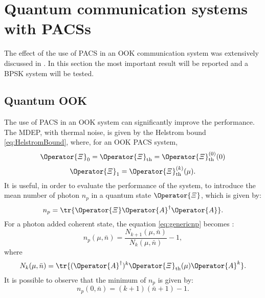 \section{Quantum communication systems with PACSs}
    The effect of the use of PACS in an OOK communication system was extensively discussed in
    \cite{PACSDisc}. In this section the most important result will be reported and a BPSK
    system will be tested.

    \subsection{Quantum OOK}
    The use of PACS in an OOK system can significantly improve the performance. The MDEP, with
    thermal noise, is given by the Helstrom bound \ref{eq:HelstromBound}, where, for an OOK PACS
    system,
    \begin{equation}
        \Operator{\varXi}_0 =  \Operator{\varXi}_{\mathrm{th}} = \Operator{\varXi}_{\mathrm{th}}^{(0)}(0)
    \end{equation}
    \begin{equation*}
        \Operator{\varXi}_1 =  \Operator{\varXi}_{\mathrm{th}}^{(k)}(\mu).
    \end{equation*}
    It is useful, in order to evaluate the performance of the system, to introduce the mean number
    of photon $n_p$ in a quantum state $\Operator{\varXi}$, which is given by:
    \begin{equation}
        n_p = \tr{\Operator{\varXi}\Operator{A}^\dagger\Operator{A}}.
        \label{eq:genericnp}
    \end{equation}
    For a photon added coherent state, the equation \ref{eq:genericnp} becomes \cite{PACSDisc}:
    \begin{equation}
        n_p(\mu,\bar{n}) = \frac{N_{k+1}(\mu,\bar{n})}{N_k(\mu,\bar{n})}-1,
        \label{eq:np}
    \end{equation}
    where
    \begin{equation}
        N_k(\mu,\bar{n}) = \tr{(\Operator{A}^\dagger)^k \Operator{\varXi}_{\mathrm{th}}(\mu) \Operator{A}^k}.
    \end{equation}
    It is possible to observe that the minimum of $n_p$ is given by:
    \begin{equation}
        n_p(0,\bar{n}) = (k+1)(\bar{n}+1)-1.
        \label{eq:min_np}
    \end{equation}

